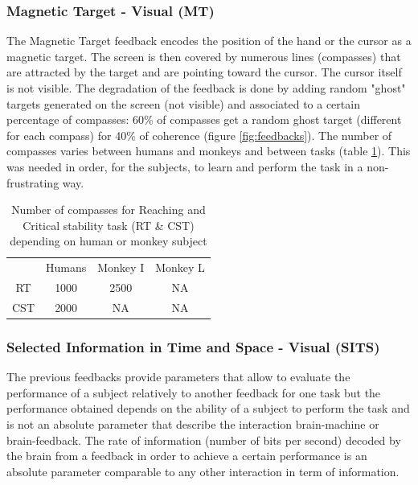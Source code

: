 \documentclass[preprint,12pt]{elsarticle}
\begin{document}
\subsubsection{Magnetic Target - Visual (MT)}
The Magnetic Target feedback encodes the position of the hand or the cursor as a magnetic target. The screen is then covered by numerous lines (compasses) that are attracted by the target and are pointing toward the cursor. The cursor itself is not visible. The degradation of the feedback is done by adding random "ghost" targets generated on the screen (not visible) and associated to a certain percentage of compasses: 60\% of compasses get a random ghost target (different for each compass) for 40\% of coherence (figure \ref{fig:feedbacks}). The number of compasses varies between humans and monkeys and between tasks (table \ref{table:lines}). This was needed in order, for the subjects, to learn and perform the task in a non-frustrating way.
\begin{table}
\begin{center}
\begin{tabular}{ |c|c|c|c| } 
 \hline
  & Humans & Monkey I & Monkey L \\ 
 RT & 1000 & 2500 & NA \\ 
 CST & 2000 & NA & NA \\ 
 \hline
\end{tabular}
\end{center}
\caption{Number of compasses for Reaching and Critical stability task (RT \& CST) depending on human or monkey subject}
\label{table:lines}
\end{table}

\subsubsection{Selected Information in Time and Space - Visual (SITS)}
The previous feedbacks provide parameters that allow to evaluate the performance of a subject relatively to another feedback for one task but the performance obtained depends on the ability of a subject to perform the task and is not an absolute parameter that describe the interaction brain-machine or brain-feedback. The rate of information (number of bits per second) decoded by the brain from a feedback in order to achieve a certain performance is an absolute parameter comparable to any other interaction in term of information.
\end{document}
